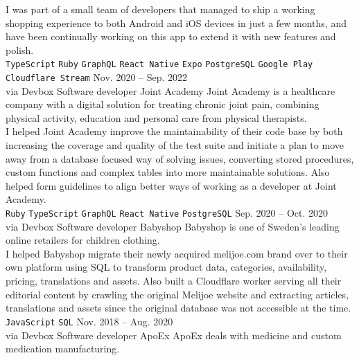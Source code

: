 \documentclass[9pt]{template} %
\begin{document}
\begin{entrylist}
{      I was part of a small team of developers that managed to ship a working
      shopping experience to both Android and iOS devices in just a few months,
      and have been continually working on this app to extend it with new
      features and polish.\\
      \texttt{TypeScript}\slashsep
      \texttt{Ruby}\slashsep
      \texttt{GraphQL}\slashsep
      \texttt{React Native}\slashsep
      \texttt{Expo}\slashsep
      \texttt{PostgreSQL}\slashsep
      \texttt{Google Play}\slashsep
      \texttt{Cloudflare Stream}
    }
  \entry
    {Nov. 2020 -- Sep. 2022\\\footnotesize{via Devbox}}
    {Software developer}
    {Joint Academy}
    {
      Joint Academy is a healthcare company with a digital solution for treating
      chronic joint pain, combining physical activity, education and personal care
      from physical therapists.\\

      I helped Joint Academy improve the maintainability of their code base by both
      increasing the coverage and quality of the test suite and initiate a plan to
      move away from a database focused way of solving issues, converting stored
      procedures, custom functions and complex tables into more maintainable solutions.
      Also helped form guidelines to align better ways of working as a developer at
      Joint Academy.\\
      \texttt{Ruby}\slashsep
      \texttt{TypeScript}\slashsep
      \texttt{GraphQL}
      \texttt{React Native}\slashsep
      \texttt{PostgreSQL}\slashsep
    }
  \entry
    {Sep. 2020 -- Oct. 2020\\\footnotesize{via Devbox}}
    {Software developer}
    {Babyshop}
    {
      Babyshop is one of Sweden's leading online retailers for children clothing.\\

      I helped Babyshop migrate their newly acquired melijoe.com brand over to their own
      platform using SQL to transform product data, categories, availability, pricing,
      translations and assets. Also built a Cloudflare worker serving all their editorial
      content by crawling the original Melijoe website and extracting articles, translations
      and assets since the original database was not accessible at the time.\\
      \texttt{JavaScript}\slashsep
      \texttt{SQL}
    }
  \entry
    {Nov. 2018 -- Aug. 2020\\\footnotesize{via Devbox}}
    {Software developer}
    {ApoEx}
    {
      ApoEx deals with medicine and custom medication manufacturing.\\

}
\end{entrylist}
\end{document}
